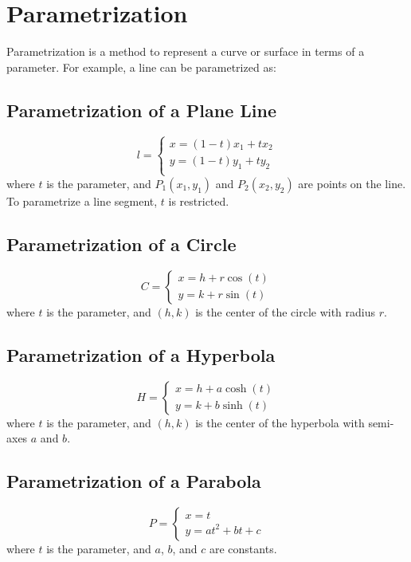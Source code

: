 \section{Parametrization}

Parametrization is a method to represent a curve or surface in terms of a parameter. For example, a line can be parametrized as:

\subsection{Parametrization of a Plane Line}
\[
    l = 
    \begin{cases}
        x = (1-t)x_1 + tx_2\\
        y = (1-t)y_1 + ty_2\\
    \end{cases}
\]
where \(t\) is the parameter, and \(P_1(x_1, y_1)\) and \(P_2(x_2, y_2)\) are points on the line.
To parametrize a line segment, \(t\) is restricted.



\subsection{Parametrization of a Circle}
\[
    C = 
    \begin{cases}
        x = h + r\cos(t)\\
        y = k + r\sin(t)
    \end{cases}
\]
where \(t\) is the parameter, and \((h, k)\) is the center of the circle with radius \(r\).

\subsection{Parametrization of a Hyperbola}
\[
    H = 
    \begin{cases}
        x = h + a\cosh(t)\\
        y = k + b\sinh(t)
    \end{cases}
\]
where \(t\) is the parameter, and \((h, k)\) is the center of the hyperbola with semi-axes \(a\) and \(b\).

\subsection{Parametrization of a Parabola}
\[
    P = 
    \begin{cases}
        x = t \\
        y = at^2 + bt + c 
    \end{cases}
\]
where \(t\) is the parameter, and \(a\), \(b\), and \(c\) are constants.


